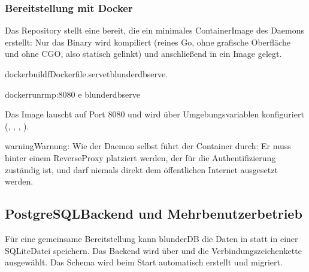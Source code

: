 \documentclass[letterpaper,10pt,german]{sphinxmanual}
\begin{document}
\subsubsection{Bereitstellung mit Docker}
\label{\detokenize{mode_headless:deploiement-avec-docker}}\label{\detokenize{mode_headless:headless-docker}}
\sphinxAtStartPar
Das Repository stellt eine  bereit, die ein minimales Container\sphinxhyphen{}Image des Daemons erstellt: Nur das \sphinxhyphen{}Binary wird kompiliert (reines Go, ohne grafische Oberfläche und ohne CGO, also statisch gelinkt) und anschließend in ein \sphinxhyphen{}Image gelegt.

\begin{sphinxVerbatim}[commandchars=\\\{\}]
dockerbuild\PYGZhy{}fDockerfile.serve\PYGZhy{}tblunderdb\PYGZhy{}serve.

dockerrun\PYGZhy{}\PYGZhy{}rm\PYGZhy{}p:8080
\PYGZhy{}e
blunderdb\PYGZhy{}serve
\end{sphinxVerbatim}

\sphinxAtStartPar
Das Image lauscht auf Port 8080 und wird über Umgebungsvariablen konfiguriert (, , , ).

\begin{sphinxadmonition}{warning}{Warnung:}
\sphinxAtStartPar
Wie der Daemon selbst führt der Container  durch: Er muss hinter einem Reverse\sphinxhyphen{}Proxy platziert werden, der für die Authentifizierung zuständig ist, und darf niemals direkt dem öffentlichen Internet ausgesetzt werden.
\end{sphinxadmonition}


\subsection{PostgreSQL\sphinxhyphen{}Backend und Mehrbenutzerbetrieb}
\label{\detokenize{mode_headless:backend-postgresql-et-multi-utilisateurs}}\label{\detokenize{mode_headless:headless-postgres}}
\sphinxAtStartPar
Für eine gemeinsame Bereitstellung kann blunderDB die Daten in  statt in einer SQLite\sphinxhyphen{}Datei speichern. Das Backend wird über  und die Verbindungszeichenkette  ausgewählt. Das Schema wird beim Start automatisch erstellt und migriert.
\end{document}
